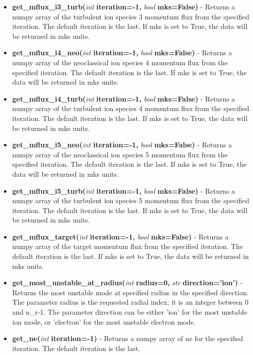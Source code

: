 \documentclass{article}
\begin{document}
\begin{itemize}
\begin{itemize}
\item \textbf{get\_mflux\_i3\_turb(}\emph{int}\textbf{ iteration=-1,}\emph{ bool}\textbf{ mks=False)} - Returns a numpy array of the turbulent ion species 3 momentum flux from the specified iteration.  The default iteration is the last.  If mks is set to True, the data will be returned in mks units.
\item \textbf{get\_mflux\_i4\_neo(}\emph{int}\textbf{ iteration=-1,}\emph{ bool}\textbf{ mks=False)} - Returns a numpy array of the neoclassical ion species 4 momentum flux from the specified iteration.  The default iteration is the last.  If mks is set to True, the data will be returned in mks units.
\item \textbf{get\_mflux\_i4\_turb(}\emph{int}\textbf{ iteration=-1,}\emph{ bool}\textbf{ mks=False)} - Returns a numpy array of the turbulent ion species 4 momentum flux from the specified iteration.  The default iteration is the last.  If mks is set to True, the data will be returned in mks units.
\item \textbf{get\_mflux\_i5\_neo(}\emph{int}\textbf{ iteration=-1,}\emph{ bool}\textbf{ mks=False)} - Returns a numpy array of the neoclassical ion species 5 momentum flux from the specified iteration.  The default iteration is the last.  If mks is set to True, the data will be returned in mks units.
\item \textbf{get\_mflux\_i5\_turb(}\emph{int}\textbf{ iteration=-1,}\emph{ bool}\textbf{ mks=False)} - Returns a numpy array of the turbulent ion species 5 momentum flux from the specified iteration.  The default iteration is the last.  If mks is set to True, the data will be returned in mks units.
\item \textbf{get\_mflux\_target(}\emph{int}\textbf{ iteration=-1,}\emph{ bool}\textbf{ mks=False)} - Returns a numpy array of the target momentum flux from the specified iteration.  The default iteration is the last.  If mks is set to True, the data will be returned in mks units.
\item \textbf{get\_most\_unstable\_at\_radius(}\emph{int}\textbf{ radius=0,}\emph{ str}\textbf{ direction='ion')} - Returns the most unstable mode at specified radius in the specified direction.  The parameter radius is the requested radial index; it is an integer between 0 and n\_r-1.  The parameter direction can be either 'ion' for the most unstable ion mode, or 'electron' for the most unstable electron mode.
\item \textbf{get\_ne(}\emph{int}\textbf{ iteration=-1)} - Returns a numpy array of ne for the specified iteration.  The default iteration is the last.

\end{itemize}
\end{itemize}
\end{document}
